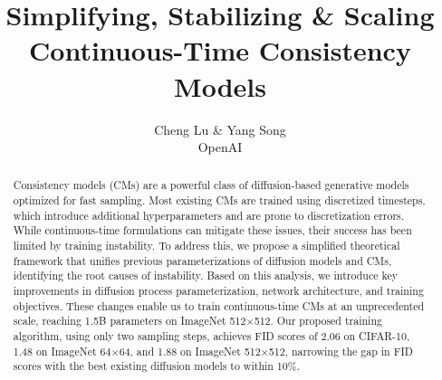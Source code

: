 \documentclass{article} %
\title{Simplifying, Stabilizing \& Scaling Continuous-Time Consistency Models}
\author{Cheng Lu \& Yang Song \\
OpenAI\\
}
\theoremstyle{remark}
\begin{document}
\maketitle

\begin{abstract}



Consistency models (CMs) are a powerful class of diffusion-based generative models optimized for fast sampling. Most existing CMs are trained using discretized timesteps, which introduce additional hyperparameters and are prone to discretization errors. While continuous-time formulations can mitigate these issues, their success has been limited by training instability. To address this, we propose a simplified theoretical framework that unifies previous parameterizations of diffusion models and CMs, identifying the root causes of instability. Based on this analysis, we introduce key improvements in diffusion process parameterization, network architecture, and training objectives. These changes enable us to train continuous-time CMs at an unprecedented scale, reaching 1.5B parameters on ImageNet 512×512. Our proposed training algorithm, using only two sampling steps, achieves FID scores of 2.06 on CIFAR-10, 1.48 on ImageNet 64×64, and 1.88 on ImageNet 512×512, narrowing the gap in FID scores with the best existing diffusion models to within 10\%.





\end{abstract}














\clearpage
\appendix

\end{document}
